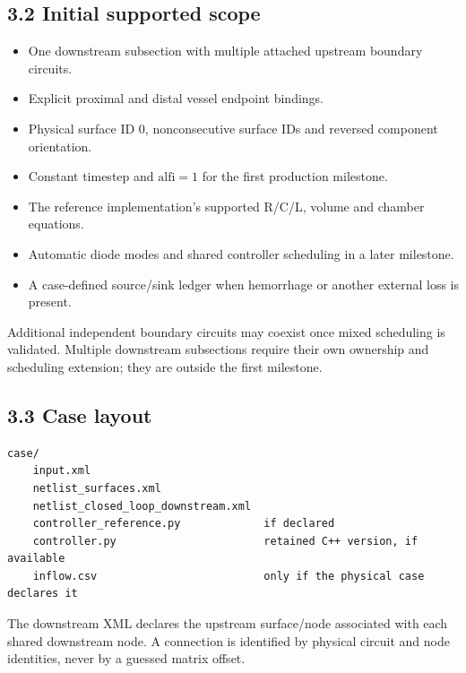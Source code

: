 \documentclass[11pt,a4paper]{article}
\begin{document}
\subsection{3.2 Initial supported scope}

\begin{itemize}
\item One downstream subsection with multiple attached upstream boundary circuits.


\item Explicit proximal and distal vessel endpoint bindings.


\item Physical surface ID 0, nonconsecutive surface IDs and reversed component orientation.


\item Constant timestep and \(\mathrm{alfi}=1\) for the first production milestone.


\item The reference implementation's supported R/C/L, volume and chamber equations.


\item Automatic diode modes and shared controller scheduling in a later milestone.


\item A case-defined source/sink ledger when hemorrhage or another external loss is present.


\end{itemize}
Additional independent boundary circuits may coexist once mixed scheduling is validated. Multiple downstream subsections require their own ownership and scheduling extension; they are outside the first milestone.

\subsection{3.3 Case layout}

\begin{lstlisting}
case/
    input.xml
    netlist_surfaces.xml
    netlist_closed_loop_downstream.xml
    controller_reference.py             if declared
    controller.py                       retained C++ version, if available
    inflow.csv                          only if the physical case declares it
\end{lstlisting}
The downstream XML declares the upstream surface/node associated with each shared downstream node. A connection is identified by physical circuit and node identities, never by a guessed matrix offset.
\end{document}
